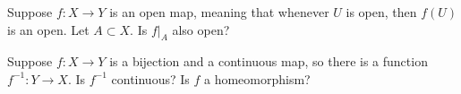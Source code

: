\documentclass[12pt]{pset}
\begin{document}
\begin{problem}

  Suppose $f : X \to Y$ is an open map, meaning that whenever $U$ is
  open, then $f(U)$ is an open.  Let $A \subset X$.  Is $f |_A$ also
  open?

\end{problem}

\begin{problem}

  Suppose $f : X \to Y$ is a bijection and a continuous map, so there
  is a function $f^{-1} : Y \to X$.  Is $f^{-1}$ continuous?  Is $f$ a
  homeomorphism?

\end{problem}
\end{document}

